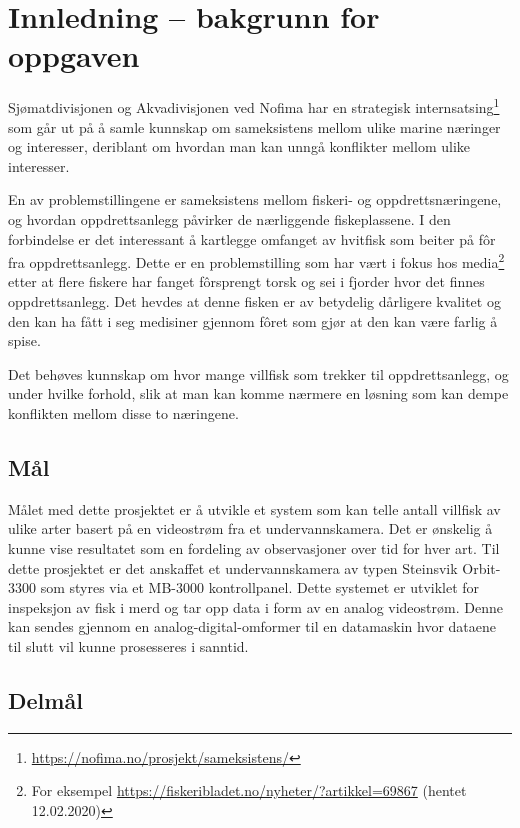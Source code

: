 \section{Innledning -- bakgrunn for oppgaven}




Sjømatdivisjonen og Akvadivisjonen ved Nofima har en strategisk internsatsing\footnote{\url{https://nofima.no/prosjekt/sameksistens/}} som går ut på å samle kunnskap om sameksistens mellom ulike marine næringer og interesser, deriblant om hvordan man kan unngå konflikter mellom ulike interesser. 

En av problemstillingene er sameksistens mellom fiskeri- og oppdrettsnæringene, og hvordan oppdrettsanlegg påvirker de nærliggende fiskeplassene. I den forbindelse er det interessant å kartlegge omfanget av hvitfisk som beiter på fôr fra oppdrettsanlegg. Dette er en problemstilling som har vært i fokus hos media\footnote{For eksempel \url{https://fiskeribladet.no/nyheter/?artikkel=69867} (hentet 12.02.2020)} etter at flere fiskere har fanget fôrsprengt torsk og sei i fjorder hvor det finnes oppdrettsanlegg. Det hevdes at denne fisken er av betydelig dårligere kvalitet og den kan ha fått i seg medisiner gjennom fôret som gjør at den kan være farlig å spise. 

Det behøves kunnskap om hvor mange villfisk som trekker til oppdrettsanlegg, og under hvilke forhold, slik at man kan komme nærmere en løsning som kan dempe konflikten mellom disse to næringene. 

\subsection{Mål}

Målet med dette prosjektet er å utvikle et system som kan telle antall villfisk av ulike arter basert på en videostrøm fra et undervannskamera. Det er ønskelig å kunne vise resultatet som en fordeling av observasjoner over tid for hver art. 
Til dette prosjektet er det anskaffet et undervannskamera av typen Steinsvik Orbit-3300 som styres via et MB-3000 kontrollpanel. Dette systemet er utviklet for inspeksjon av fisk i merd og tar opp data i form av en analog videostrøm. Denne kan sendes gjennom en analog-digital-omformer til en datamaskin hvor dataene til slutt vil kunne prosesseres i sanntid. 

\subsection{Delmål}

